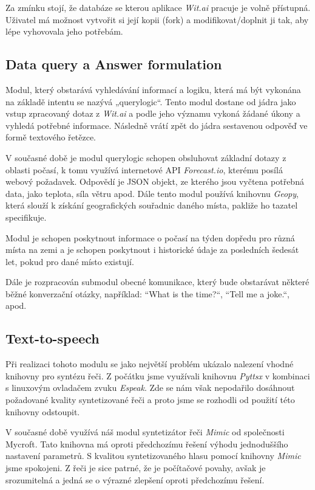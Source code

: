 \documentclass[12pt,a4paper]{article}
\begin{document}
Za zmínku stojí, že databáze se kterou aplikace \textit{Wit.ai} pracuje je volně přístupná. Uživatel má možnost vytvořit si její kopii (fork) a modifikovat/doplnit ji tak, aby lépe vyhovovala jeho potřebám.

\subsection*{Data query a Answer formulation}
Modul, který obstarává vyhledávání informací a logiku, která má být vykonána na základě intentu se nazývá „querylogic“. Tento modul dostane od jádra jako vstup zpracovaný dotaz z \textit{Wit.ai} a podle jeho významu vykoná žádané úkony a vyhledá potřebné informace. Následně vrátí zpět do jádra sestavenou odpověď ve formě textového řetězce.

V současné době je modul querylogic schopen obsluhovat základní dotazy z oblasti počasí, k tomu využívá internetové API \textit{Forecast.io}, kterému posílá webový požadavek. Odpovědí je JSON objekt, ze kterého jsou vyčtena potřebná data, jako teplota, síla větru apod.
Dále tento modul používá knihovnu \textit{Geopy}, která slouží k získání geografických souřadnic daného místa, pakliže ho tazatel specifikuje. 

Modul je schopen poskytnout informace o počasí na týden dopředu pro různá místa na zemi a je schopen poskytnout i historické údaje za posledních šedesát let, pokud pro dané místo existují.

Dále je rozpracován submodul obecné komunikace, který bude obstarávat některé běžné konverzační otázky, například:  “What is the time?“, “Tell me a joke.“, apod.

\subsection*{Text-to-speech}
Při realizaci tohoto modulu se jako největší problém ukázalo nalezení vhodné knihovny pro syntézu řeči. Z počátku jsme využívali knihovnu \textit{Pyttsx} v kombinaci s linuxovým ovladačem zvuku \textit{Espeak}. Zde se nám však nepodařilo dosáhnout požadované kvality syntetizované řeči a proto jsme se rozhodli od použití této knihovny odstoupit.

V současné době využívá náš modul syntetizátor řeči \textit{Mimic} od společnosti Mycroft. 
Tato knihovna má oproti předchozímu řešení výhodu jednoduššího nastavení parametrů. S kvalitou syntetizovaného hlasu pomocí knihovny \textit{Mimic} jsme spokojeni. Z řeči je sice patrné, že je počítačové povahy, avšak je srozumitelná a jedná se o výrazné zlepšení oproti předchozímu řešení.
\end{document}
